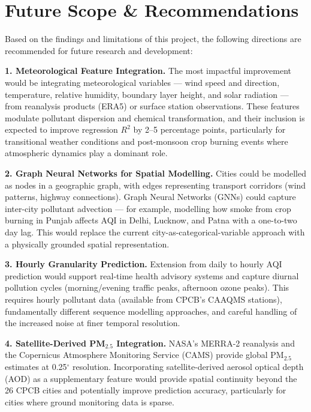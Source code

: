 \documentclass[12pt,a4paper]{report}
\begin{document}
\chapter{Future Scope \& Recommendations}\label{idx:ch9}

Based on the findings and limitations of this project, the following directions are recommended for future research and development:

\textbf{1. Meteorological Feature Integration.} The most impactful improvement would be integrating meteorological variables --- wind speed and direction, temperature, relative humidity, boundary layer height, and solar radiation --- from reanalysis products (ERA5) or surface station observations. These features modulate pollutant dispersion and chemical transformation, and their inclusion is expected to improve regression $R^2$ by 2--5 percentage points, particularly for transitional weather conditions and post-monsoon crop burning events where atmospheric dynamics play a dominant role.

\textbf{2. Graph Neural Networks for Spatial Modelling.} Cities could be modelled as nodes in a geographic graph, with edges representing transport corridors (wind patterns, highway connections). Graph Neural Networks (GNNs) could capture inter-city pollutant advection --- for example, modelling how smoke from crop burning in Punjab affects AQI in Delhi, Lucknow, and Patna with a one-to-two day lag. This would replace the current city-as-categorical-variable approach with a physically grounded spatial representation.

\textbf{3. Hourly Granularity Prediction.} Extension from daily to hourly AQI prediction would support real-time health advisory systems and capture diurnal pollution cycles (morning/evening traffic peaks, afternoon ozone peaks). This requires hourly pollutant data (available from CPCB's CAAQMS stations), fundamentally different sequence modelling approaches, and careful handling of the increased noise at finer temporal resolution.

\textbf{4. Satellite-Derived PM$_{2.5}$ Integration.} NASA's MERRA-2 reanalysis and the Copernicus Atmosphere Monitoring Service (CAMS) provide global PM$_{2.5}$ estimates at 0.25$^\circ$ resolution. Incorporating satellite-derived aerosol optical depth (AOD) as a supplementary feature would provide spatial continuity beyond the 26 CPCB cities and potentially improve prediction accuracy, particularly for cities where ground monitoring data is sparse.
\end{document}
